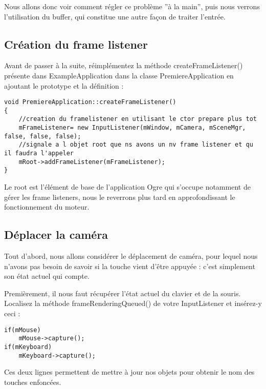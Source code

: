 Nous allons donc voir comment régler ce problème ''à la main'', puis nous verrons l'utilisation du buffer, qui constitue une autre façon de traiter l'entrée.

\subsection{Création du frame listener}

Avant de passer à la suite, réimplémentez la méthode createFrameListener() présente dans ExampleApplication dans la classe PremiereApplication en ajoutant le prototype et la définition :

\begin{lstlisting}[caption={PremiereApplication::createFrameListener}]
void PremiereApplication::createFrameListener()
{
    //creation du framelistener en utilisant le ctor prepare plus tot
    mFrameListener= new InputListener(mWindow, mCamera, mSceneMgr, false, false, false);
    //signale a l objet root que ns avons un nv frame listener et qu il faudra l'appeler
    mRoot->addFrameListener(mFrameListener);
}
\end{lstlisting}

Le root est l'élément de base de l'application Ogre qui s'occupe notamment de gérer les frame listeners, nous le reverrons plus tard en approfondissant le fonctionnement du moteur.
 









\subsection{Déplacer la caméra}


Tout d'abord, nous allons considérer le déplacement de caméra, pour lequel nous n'avons pas besoin de savoir si la touche vient d'être appuyée : c'est simplement son état actuel qui compte.

Premièrement, il nous faut récupérer l'état actuel du clavier et de la souris. Localisez la méthode frameRenderingQueued() de votre InputListener et insérez-y ceci :


\begin{lstlisting}[caption={}]
if(mMouse)
    mMouse->capture();
if(mKeyboard)
    mKeyboard->capture();
\end{lstlisting}

Ces deux lignes permettent de mettre à jour nos objets pour obtenir le nom des touches enfoncées.\newline

